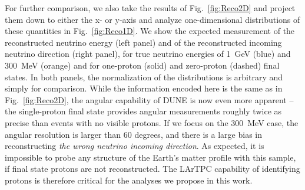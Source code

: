 For further comparison, we also take the results of Fig.~\ref{fig:Reco2D} and project them down to either the x- or y-axis and analyze one-dimensional distributions of these quantities in Fig.~\ref{fig:Reco1D}.
We show the expected measurement of the reconstructed neutrino energy (left panel) and of the reconstructed incoming neutrino direction (right panel), for true neutrino energies of 1~GeV (blue) and 300~MeV (orange) and for one-proton (solid) and zero-proton (dashed) final states.
In both panels, the normalization of the distributions is arbitrary and simply for comparison. 
While the information encoded here is the same as in Fig.~\ref{fig:Reco2D}, the angular capability of DUNE is now even more apparent -- the single-proton final state provides angular measurements roughly twice as precise than events with no visible protons. 
If we focus on the 300~MeV case, the angular resolution is larger than 60 degrees, and there is a large bias in reconstructing \emph{the wrong neutrino incoming direction}.
As expected, it is impossible to probe any structure of the Earth's matter profile with this sample, if final state protons are not reconstructed.
The LArTPC capability of identifying protons is therefore critical for the analyses we propose in this work.















